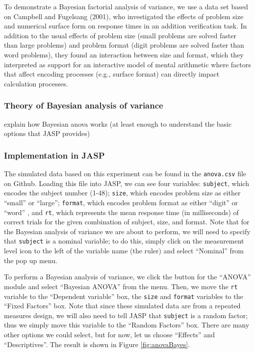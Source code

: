 \documentclass[english,,doc,floatsintext]{apa6}
\begin{document}
To demonstrate a Bayesian factorial analysis of variance, we use a data set based on Campbell and Fugelsang (2001), who investigated the effects of problem size and numerical surface form on response times in an addition verification task. In addition to the usual effects of problem size (small problems are solved faster than large problems) and problem format (digit problems are solved faster than word problems), they found an interaction between size and format, which they interpreted as support for an interactive model of mental arithmetic where factors that affect encoding processes (e.g., surface format) can directly impact calculation processes.

\hypertarget{theory-of-bayesian-analysis-of-variance}{%
\subsubsection{Theory of Bayesian analysis of variance}\label{theory-of-bayesian-analysis-of-variance}}

explain how Bayesian anova works (at least enough to understand the basic options that JASP provides)

\hypertarget{implementation-in-jasp-2}{%
\subsubsection{Implementation in JASP}\label{implementation-in-jasp-2}}

The simulated data based on this experiment can be found in the \texttt{anova.csv} file on Github. Loading this file into JASP, we can see four variables: \texttt{subject}, which encodes the subject number (1-48); \texttt{size}, which encodes problem size as either \enquote{small} or \enquote{large}; \texttt{format}, which encodes problem format as either \enquote{digit} or \enquote{word} , and \texttt{rt}, which represents the mean response time (in milliseconds) of correct trials for the given combination of subject, size, and format. Note that for the Bayesian analysis of variance we are about to perform, we will need to specify that \texttt{subject} is a nominal variable; to do this, simply click on the measurement level icon to the left of the variable name (the ruler) and select \enquote{Nominal} from the pop up menu.

To perform a Bayesian analysis of variance, we click the button for the \enquote{ANOVA} module and select \enquote{Bayesian ANOVA} from the menu. Then, we move the \texttt{rt} variable to the \enquote{Dependent variable} box, the \texttt{size} and \texttt{format} variables to the \enquote{Fixed Factors} box. Note that since these simulated data are from a repeated measures design, we will also need to tell JASP that \texttt{subject} is a random factor; thus we simply move this variable to the \enquote{Random Factors} box. There are many other options we could select, but for now, let us choose \enquote{Effects} and \enquote{Descriptives}. The result is shown in Figure \ref{fig:anovaBayes}.
\end{document}
